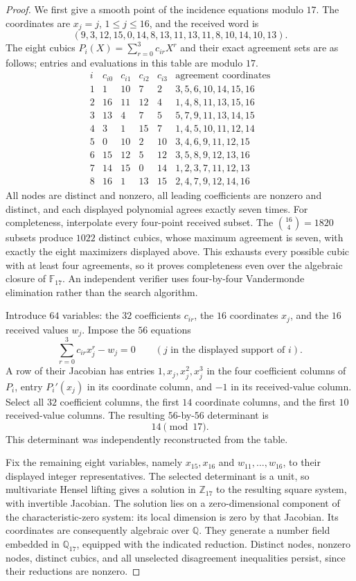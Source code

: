\begin{proof}
We first give a smooth point of the incidence equations modulo $17$.
The coordinates are $x_j=j$, $1\le j\le16$, and the received word is
\[
 (9,3,12,15,0,14,8,13,11,13,11,8,10,14,10,13).
\]
The eight cubics $P_i(X)=\sum_{r=0}^3 c_{ir}X^r$ and their exact agreement
sets are as follows; entries and evaluations in this table are modulo $17$.
\[
\begin{array}{c|rrrr|l}
 i&c_{i0}&c_{i1}&c_{i2}&c_{i3}&\text{agreement coordinates}\\\hline
 1&1&10&7&2&3,5,6,10,14,15,16\\
 2&16&11&12&4&1,4,8,11,13,15,16\\
 3&13&4&7&5&5,7,9,11,13,14,15\\
 4&3&1&15&7&1,4,5,10,11,12,14\\
 5&0&10&2&10&3,4,6,9,11,12,15\\
 6&15&12&5&12&3,5,8,9,12,13,16\\
 7&14&15&0&14&1,2,3,7,11,12,13\\
 8&16&1&13&15&2,4,7,9,12,14,16
\end{array}
\]
All nodes are distinct and nonzero, all leading coefficients are nonzero
and distinct, and each displayed polynomial agrees exactly seven times.
For completeness, interpolate every four-point received subset. The
$\binom{16}{4}=1820$ subsets produce $1022$ distinct cubics, whose maximum
agreement is seven, with exactly the eight maximizers displayed above.
This exhausts every possible cubic with at least four agreements, so it
proves completeness even over the algebraic closure of $\mathbb F_{17}$.
An independent verifier uses four-by-four Vandermonde elimination rather
than the search algorithm.

Introduce $64$ variables: the $32$ coefficients $c_{ir}$, the $16$
coordinates $x_j$, and the $16$ received values $w_j$. Impose the $56$
equations
\[
 \sum_{r=0}^3c_{ir}x_j^r-w_j=0\qquad(j\text{ in the displayed support of }i).
\]
A row of their Jacobian has entries $1,x_j,x_j^2,x_j^3$ in the four
coefficient columns of $P_i$, entry $P_i'(x_j)$ in its coordinate column,
and $-1$ in its received-value column. Select all $32$ coefficient
columns, the first $14$ coordinate columns, and the first $10$
received-value columns. The resulting $56$-by-$56$ determinant is
\[
                         14\pmod {17}.
\]
This determinant was independently reconstructed from the table.

Fix the remaining eight variables, namely $x_{15},x_{16}$ and
$w_{11},\ldots,w_{16}$, to their displayed integer representatives.
The selected determinant is a unit, so multivariate Hensel lifting gives
a solution in $\mathbb Z_{17}$ to the resulting square system, with
invertible Jacobian. The solution lies on a zero-dimensional component
of the characteristic-zero system: its local dimension is zero by that
Jacobian. Its coordinates are consequently algebraic over $\mathbb Q$.
They generate a number field embedded in $\mathbb Q_{17}$, equipped with
the indicated reduction. Distinct nodes, nonzero nodes, distinct cubics,
and all unselected disagreement inequalities persist, since their
reductions are nonzero.


\end{proof}
